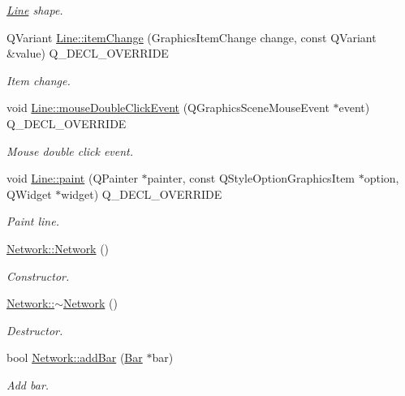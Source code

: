 \begin{DoxyCompactItemize}
\begin{DoxyCompactList}\small\item\em \hyperlink{class_line}{Line} shape. \end{DoxyCompactList}\item 
Q\+Variant \hyperlink{group___models_ga5fcee3f23eb50e34f730d602a3802b93}{Line\+::item\+Change} (Graphics\+Item\+Change change, const Q\+Variant \&value) Q\+\_\+\+D\+E\+C\+L\+\_\+\+O\+V\+E\+R\+R\+I\+D\+E
\begin{DoxyCompactList}\small\item\em Item change. \end{DoxyCompactList}\item 
void \hyperlink{group___models_ga9a1fee5b1606ab0deedd04bdab99be70}{Line\+::mouse\+Double\+Click\+Event} (Q\+Graphics\+Scene\+Mouse\+Event $\ast$event) Q\+\_\+\+D\+E\+C\+L\+\_\+\+O\+V\+E\+R\+R\+I\+D\+E
\begin{DoxyCompactList}\small\item\em Mouse double click event. \end{DoxyCompactList}\item 
void \hyperlink{group___models_ga0aa64aed379d434be5942edf572b444b}{Line\+::paint} (Q\+Painter $\ast$painter, const Q\+Style\+Option\+Graphics\+Item $\ast$option, Q\+Widget $\ast$widget) Q\+\_\+\+D\+E\+C\+L\+\_\+\+O\+V\+E\+R\+R\+I\+D\+E
\begin{DoxyCompactList}\small\item\em Paint line. \end{DoxyCompactList}\item 
\hyperlink{group___models_ga3cc2fb4f8fa4d507077e8da85ce5a1c8}{Network\+::\+Network} ()
\begin{DoxyCompactList}\small\item\em Constructor. \end{DoxyCompactList}\item 
\hyperlink{group___models_ga7a4e19cdb4bf0c7ecf82baa643831492}{Network\+::$\sim$\+Network} ()
\begin{DoxyCompactList}\small\item\em Destructor. \end{DoxyCompactList}\item 
bool \hyperlink{group___models_ga8c5dfef0216731246f7411e1a5fbee01}{Network\+::add\+Bar} (\hyperlink{class_bar}{Bar} $\ast$bar)
\begin{DoxyCompactList}\small\item\em Add bar. \end{DoxyCompactList}\item 

\end{DoxyCompactItemize}
